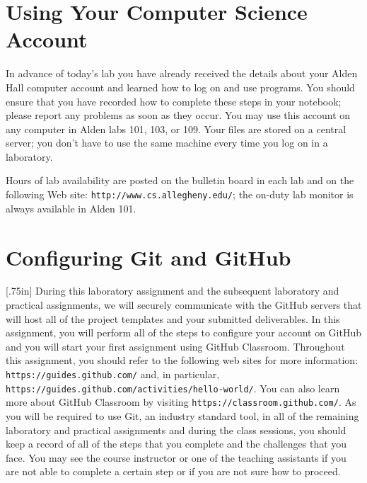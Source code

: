 \documentclass[11pt]{article}
\newcommand{\url}[1]{\lstinline{#1}}
\newcommand{\resource}[1]{\null\hfill\LARGE{\faLink{}}\newline\scriptsize{\em{#1}}}
\begin{document}
\section*{Using Your Computer Science Account}

In advance of today's lab you have already received the details about your
Alden Hall computer account and learned how to log on and use programs. You
should ensure that you have recorded how to complete these steps in your
notebook; please report any problems as soon as they occur. You may use this
account on any computer in Alden labs 101, 103, or 109. Your files are stored
on a central server; you don't have to use the same machine every time you log
on in a laboratory.

Hours of lab availability are posted on the bulletin board in each lab and on
the following Web site: \url{http://www.cs.allegheny.edu/}; the on-duty lab
monitor is always available in Alden 101.

\section*{Configuring Git and GitHub}

\marginnote{\resource{Learn about GitHub}}[.75in] During this laboratory
assignment and the subsequent laboratory and practical assignments, we will
securely communicate with the GitHub servers that will host all of the project
templates and your submitted deliverables. In this assignment, you will perform
all of the steps to configure your account on GitHub and you will start your
first assignment using GitHub Classroom. Throughout this assignment, you should
refer to the following web sites for more information:
\url{https://guides.github.com/} and, in particular,
\url{https://guides.github.com/activities/hello-world/}. You can also learn
more about GitHub Classroom by visiting \url{https://classroom.github.com/}. As
you will be required to use Git, an industry standard tool, in all of the
remaining laboratory and practical assignments and during the class sessions,
you should keep a record of all of the steps that you complete and the
challenges that you face. You may see the course instructor or one of the
teaching assistants if you are not able to complete a certain step or if you
are not sure how to proceed.
\end{document}
